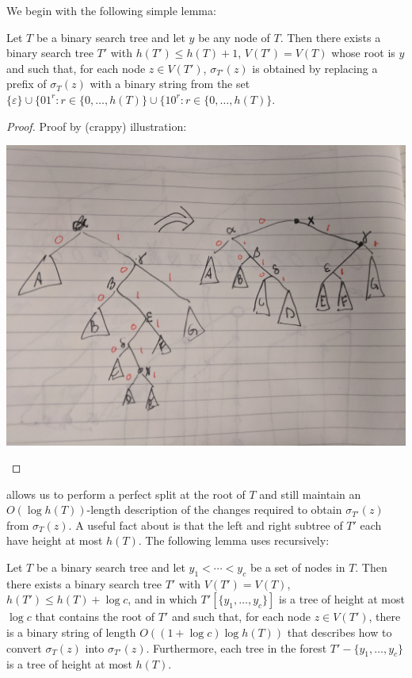 \documentclass[kpfonts]{patmorin}
\begin{document}
We begin with the following simple lemma:

\begin{lem}
  Let $T$ be a binary search tree and let $y$ be any node of $T$.  Then there exists a binary search tree $T'$ with $h(T')\le h(T)+1$, $V(T')=V(T)$ whose root is $y$ and such that, for each node $z\in V(T')$, $\sigma_{T'}(z)$ is obtained by replacing a prefix of $\sigma_{T}(z)$ with a binary string from the set $\{\varepsilon\}\cup \{01^r:r\in\{0,\ldots,h(T)\}\cup \{10^r:r\in\{0,\ldots,h(T)\}$.  
\end{lem}

\begin{proof}
Proof by (crappy) illustration:
  \begin{center}
    \includegraphics[width=.6\textwidth]{images/split}
  \end{center}
\end{proof}

 allows us to perform a perfect split at the root of $T$ and still maintain an $O(\log h(T))$-length description of the changes required to obtain $\sigma_{T'}(z)$ from $\sigma_T(z)$.  A useful fact about  is that the left and right subtree of $T'$ each have height at most $h(T)$.
The following lemma uses  recursively:

\begin{lem}
  Let $T$ be a binary search tree and let $y_1<\cdots<y_c$ be a set of nodes in $T$. Then there exists a binary search tree $T'$ with $V(T')=V(T)$, $h(T')\le h(T)+\log c$, and in which $T'[\{y_1,\ldots,y_c\}]$ is a tree of height at most $\log c$ that contains the root of $T'$ and such that, for each node $z\in V(T')$, there is a binary string of length $O((1+\log c)\log h(T))$ that describes how to convert $\sigma_T(z)$ into $\sigma_{T'}(z)$.  Furthermore, each tree in the forest $T'-\{y_1,\ldots,y_c\}$ is a tree of height at most $h(T)$.
\end{lem}
\end{document}
